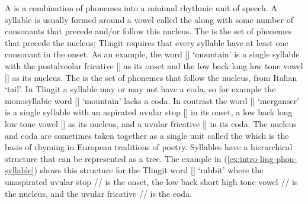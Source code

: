 A  is a combination of phonemes into a minimal rhythmic unit of speech. A syllable is usually formed around a vowel called the  along with some number of consonants that precede and/or follow this nucleus. The  is the set of phonemes that precede the nucleus; Tlingit requires that every syllable have at least one consonant in the onset. As an example, the word  [] ‘mountain’ is a single syllable with the postalveolar fricative [] as its onset and the low back long low tone vowel [] as its nucleus. The  is the set of phonemes that follow the nucleus, from Italian  ‘tail’. In Tlingit a syllable may or may not have a coda, so for example the monosyllabic word  [] ‘mountain’ lacks a coda. In contrast the word  [] ‘merganser’ is a single syllable with an aspirated uvular stop [] in its onset, a low back long low tone vowel [] as its nucleus, and a uvular fricative [] in its coda. The nucleus and coda are sometimes taken together as a single unit called the  which is the basis of rhyming in European traditions of poetry. Syllables have a hierarchical structure that can be represented as a tree. The example in (\ref{ex:intro-ling-phon-syllable}) shows this structure for the Tlingit word  [] ‘rabbit’ where the unaspirated uvular stop // is the onset, the low back short high tone vowel // is the nucleus, and the uvular fricative // is the coda.

\ex\label{ex:intro-ling-phon-syllable}%
\xe

